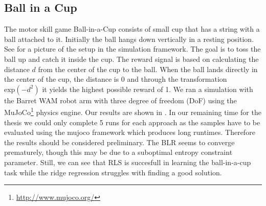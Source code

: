 \subsection{Ball in a Cup}
The motor skill game Ball-in-a-Cup consists
of small cup that has a string with a ball attached to it.
Initially the ball hangs down vertically in a resting position.
See  for a picture of the setup in the simulation
framework.
The goal is to toss the ball up and catch it inside the cup.
The reward signal is based on calculating the distance $d$ from
the center of the cup to the ball. When the ball lands directly in
the center of the cup, the distance is 0 and through the
transformation $\text{exp}(-d^2)$ it yields the highest possible
reward of 1.
We ran a simulation with the Barret WAM robot arm with three
degree of freedom (DoF) using the
MuJoCo\footnote{\href{http://www.mujoco.org/}{http://www.mujoco.org/}}
physics engine.
Our results are shown in .
In our remaining time for the thesis we could only complete
5 runs for each approach as the samples have to be evaluated using the
mujoco framework which produces long runtimes. Therefore
the results should be considered preliminary.
The BLR seems to converge prematurely, though this may be due to
a suboptimal entropy constraint parameter.
Still, we can see that RLS is succesfull in learning the ball-in-a-cup task
while the ridge regression struggles with finding a good solution.


